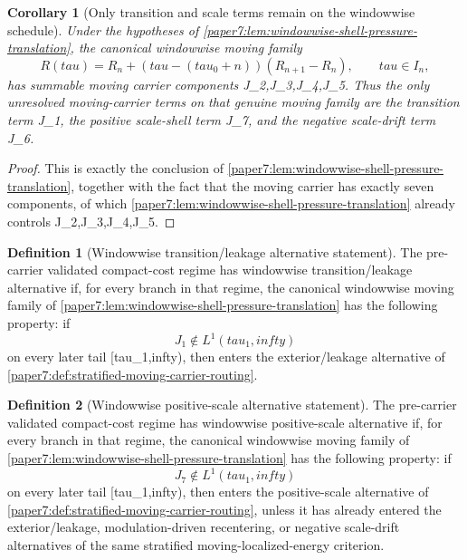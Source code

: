 \documentclass[11pt]{amsart}
\def\({}%
\def\){}%
\def\tau{tau}%
\def\infty{infty}%
\theoremstyle{plain}
\newtheorem{corollary}[corollary]{Corollary}
\theoremstyle{definition}
\newtheorem{definition}[definition]{Definition}
\theoremstyle{remark}
\begin{document}
\begin{corollary}[Only transition and scale terms remain on the windowwise schedule]
\label{paper7:cor:windowwise-only-transition-and-scale-remain}
Under the hypotheses of
\cref{paper7:lem:windowwise-shell-pressure-translation}, the canonical
windowwise moving family
\[
  R(\tau)
  =
  R_n+(\tau-(\tau_0+n))(R_{n+1}-R_n),
  \qquad \tau\in I_n,
\]
has summable moving carrier components \(J_2,J_3,J_4,J_5\).  Thus the only
unresolved moving-carrier terms on that genuine moving family are the
transition term \(J_1\), the positive scale-shell term \(J_7\), and the
negative scale-drift term \(J_6\).
\end{corollary}

\begin{proof}
This is exactly the conclusion of
\cref{paper7:lem:windowwise-shell-pressure-translation}, together with the fact
that the moving carrier has exactly seven components, of which
\cref{paper7:lem:windowwise-shell-pressure-translation} already controls
\(J_2,J_3,J_4,J_5\).
\end{proof}

\begin{definition}[Windowwise transition/leakage alternative statement]
\label{paper7:def:windowwise-transition-routing}
The pre-carrier validated compact-cost regime has windowwise
transition/leakage alternative if, for every branch \(\omega\) in that regime,
the canonical windowwise moving family of
\cref{paper7:lem:windowwise-shell-pressure-translation} has the following
property: if
\[
  J_1\notin L^1(\tau_1,\infty)
\]
on every later tail \([\tau_1,\infty)\), then \(\omega\) enters the
exterior/leakage alternative of
\cref{paper7:def:stratified-moving-carrier-routing}.
\end{definition}

\begin{definition}[Windowwise positive-scale alternative statement]
\label{paper7:def:windowwise-positive-scale-routing}
The pre-carrier validated compact-cost regime has windowwise positive-scale
alternative if, for every branch \(\omega\) in that regime, the canonical
windowwise moving family of
\cref{paper7:lem:windowwise-shell-pressure-translation} has the following
property: if
\[
  J_7\notin L^1(\tau_1,\infty)
\]
on every later tail \([\tau_1,\infty)\), then \(\omega\) enters the
positive-scale alternative of
\cref{paper7:def:stratified-moving-carrier-routing}, unless it has already
entered the exterior/leakage, modulation-driven recentering, or negative
scale-drift alternatives of the same stratified moving-localized-energy criterion.
\end{definition}
\end{document}
